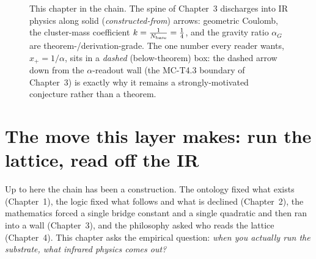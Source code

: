 \begin{figure}[t]
  \centering
  \caption[This chapter in the chain]{This chapter in the chain. The spine of
    Chapter~3 discharges into IR physics along solid (\emph{constructed-from})
    arrows: geometric Coulomb, the cluster-mass coefficient $k=\tfrac{1}{N_{\mathrm{base}}}=\tfrac14$, and the
    gravity ratio $\alpha_G$ are theorem-/derivation-grade. The one number every
    reader wants, $x_+ = 1/\alpha$, sits in a \emph{dashed} (below-theorem) box:
    the dashed arrow down from the $\alpha$-readout wall (the MC-T4.3 boundary of
    Chapter~3) is exactly why it remains a strongly-motivated conjecture rather
    than a theorem.}
  \label{fig:minimap-physics}
\end{figure}

\section*{The move this layer makes: run the lattice, read off the IR}

Up to here the chain has been a construction. The ontology fixed what exists
(Chapter~1), the logic fixed what follows and what is declined (Chapter~2), the
mathematics forced a single bridge constant and a single quadratic and then ran
into a wall (Chapter~3), and the philosophy asked who reads the lattice
(Chapter~4). This chapter asks the empirical question: \emph{when you actually
run the substrate, what infrared physics comes out?}


